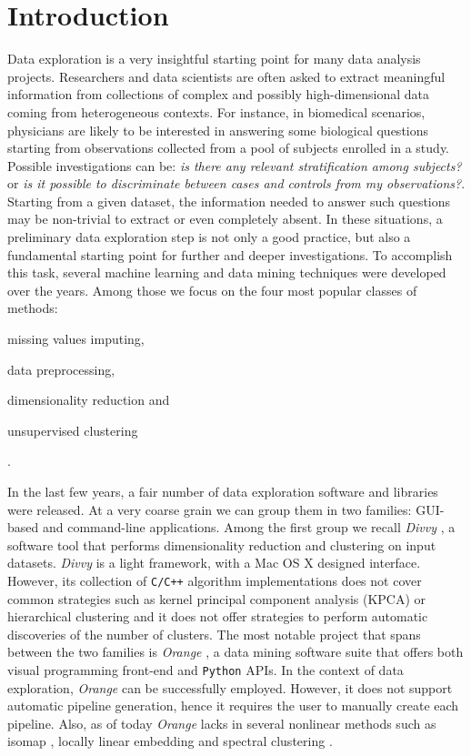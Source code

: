 \documentclass[twoside,11pt]{article}
\makeatletter
\newcommand{\py}{\texttt{Python}\@\xspace}
\makeatother
\begin{document}
\section{Introduction}\label{sec:intro}
Data exploration is a very insightful starting point for many data analysis projects. Researchers and data scientists are often asked to extract meaningful information from collections of complex and possibly high-dimensional data coming from heterogeneous contexts. For instance, in biomedical scenarios, physicians are likely to be interested in answering some biological questions starting from observations collected from a pool of subjects enrolled in a study. Possible investigations can be: \emph{is there any relevant stratification among subjects?} or \emph{is it possible to discriminate between cases and controls from my observations?}. Starting from a given dataset, the information needed to answer such questions may be non-trivial to extract or even completely absent.
In these situations, a preliminary data exploration step is not only a good practice, but also a fundamental starting point for further and deeper investigations. To accomplish this task, several machine learning and data mining techniques were developed over the years. Among those we focus on the four most popular classes of methods: \begin{enumerate*}[label=(\roman*)]
  \item missing values imputing,
  \item data preprocessing,
  \item dimensionality reduction and
  \item unsupervised clustering
\end{enumerate*}.

In the last few years, a fair number of data exploration software and libraries were released. At a very coarse grain we can group them in two families: GUI-based and command-line applications. 
Among the first group we recall \emph{Divvy} \citep{lewis2013divvy}, a software tool that performs dimensionality reduction and clustering on input datasets. \emph{Divvy} is a light framework, with a Mac OS X designed interface. However,
its collection of \texttt{C/C++} algorithm implementations does not cover common strategies such as kernel principal component analysis (KPCA) \citep{scholkopf1997kernel} or hierarchical clustering \citep{friedman2001elements} and it does not offer strategies to perform automatic discoveries of the number of clusters. The most notable project that spans between the two families is \emph{Orange} \citep{demvsar2013orange}, a data mining software suite that offers both visual programming front-end and \py APIs. In the context of data exploration, \emph{Orange} can be successfully employed. However, it does not support automatic pipeline generation, hence it requires the user to manually create each pipeline. Also, as of today \emph{Orange} lacks in several nonlinear methods such as isomap \citep{tenenbaum2000global}, locally linear embedding \citep{roweis2000nonlinear} and spectral clustering \citep{shi2000normalized}.
\end{document}
